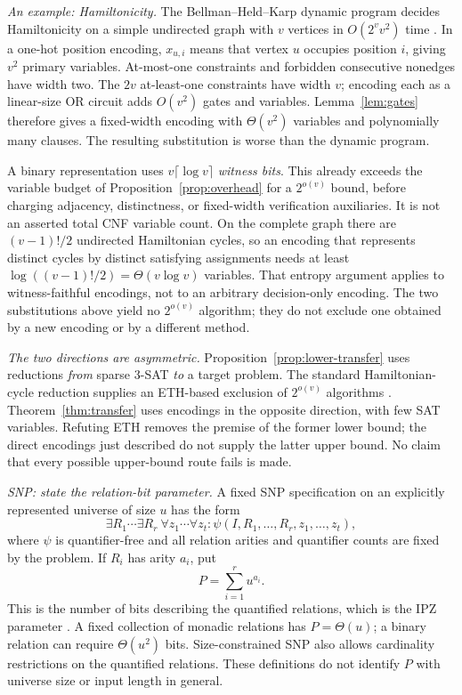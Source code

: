 \documentclass[11pt,reqno]{amsart}
\numberwithin{equation}{section}
\theoremstyle{plain}
\theoremstyle{definition}
\theoremstyle{remark}
\newcommand{\parhead}[1]{\par\smallskip\noindent\textit{#1}\enspace\ignorespaces}
\begin{document}
\parhead{An example: Hamiltonicity.}
The Bellman--Held--Karp dynamic program decides Hamiltonicity on a simple
undirected graph with $v$ vertices in $O(2^vv^2)$ time
\cite{Bellman,HeldKarp}. In a one-hot position encoding,
$x_{u,i}$ means that vertex $u$ occupies position $i$, giving $v^2$
primary variables. At-most-one constraints and forbidden consecutive
nonedges have width two. The $2v$ at-least-one constraints have width $v$;
encoding each as a linear-size OR circuit adds $O(v^2)$ gates and variables.
Lemma~\ref{lem:gates} therefore gives a fixed-width encoding with
$\Theta(v^2)$ variables and polynomially many clauses. The resulting
substitution is worse than the dynamic program.

A binary representation uses $v\lceil\log v\rceil$ \emph{witness bits}.
This already exceeds the variable budget of
Proposition~\ref{prop:overhead} for a $2^{o(v)}$ bound, before charging
adjacency, distinctness, or fixed-width verification auxiliaries. It is not
an asserted total CNF variable count. On the complete graph there are
$(v-1)!/2$ undirected Hamiltonian cycles, so an encoding that represents
distinct cycles by distinct satisfying assignments needs at least
$\log((v-1)!/2)=\Theta(v\log v)$ variables. That entropy argument applies
to witness-faithful encodings, not to an arbitrary decision-only encoding.
The two substitutions above yield no $2^{o(v)}$ algorithm; they do not
exclude one obtained by a new encoding or by a different method.

\parhead{The two directions are asymmetric.}
Proposition~\ref{prop:lower-transfer} uses reductions \emph{from} sparse
3-SAT \emph{to} a target problem. The standard Hamiltonian-cycle reduction
supplies an ETH-based exclusion of $2^{o(v)}$ algorithms \cite{LMS}.
Theorem~\ref{thm:transfer} uses encodings in the opposite direction, with
few SAT variables. Refuting ETH removes the premise of the former lower
bound; the direct encodings just described do not supply the latter upper
bound. No claim that every possible upper-bound route fails is made.

\parhead{SNP: state the relation-bit parameter.}
A fixed SNP specification on an explicitly represented universe of size
$u$ has the form
\[
 \exists R_1\cdots\exists R_r\ \forall z_1\cdots\forall z_t:
                 \psi(I,R_1,\ldots,R_r,z_1,\ldots,z_t),
\]
where $\psi$ is quantifier-free and all relation arities and quantifier
counts are fixed by the problem. If $R_i$ has arity $a_i$, put
\begin{equation}\label{eq:snp-parameter}
                         P=\sum_{i=1}^r u^{a_i}.
\end{equation}
This is the number of bits describing the quantified relations, which is
the IPZ parameter \cite{IPZ}. A fixed collection of monadic relations has
$P=\Theta(u)$; a binary relation can require $\Theta(u^2)$ bits.
Size-constrained SNP also allows cardinality restrictions on the
quantified relations. These definitions do not identify $P$ with universe
size or input length in general.
\end{document}
